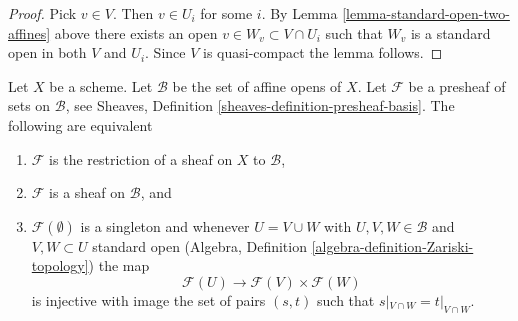 \begin{proof}
Pick $v \in V$. Then $v \in U_i$ for some $i$.
By Lemma \ref{lemma-standard-open-two-affines} above there exists an open
$v \in W_v \subset V \cap U_i$ such that
$W_v$ is a standard open in both $V$ and $U_i$.
Since $V$ is quasi-compact the lemma follows.
\end{proof}

\begin{lemma}
\label{lemma-sheaf-on-affines}
Let $X$ be a scheme. Let $\mathcal{B}$ be the set of affine opens of $X$.
Let $\mathcal{F}$ be a presheaf of sets on $\mathcal{B}$, see
Sheaves, Definition \ref{sheaves-definition-presheaf-basis}. The following
are equivalent
\begin{enumerate}
\item $\mathcal{F}$ is the restriction of a sheaf on $X$ to $\mathcal{B}$,
\item $\mathcal{F}$ is a sheaf on $\mathcal{B}$, and
\item $\mathcal{F}(\emptyset)$ is a singleton and
whenever $U = V \cup W$ with $U, V, W \in \mathcal{B}$ and
$V, W \subset U$ standard open
(Algebra, Definition \ref{algebra-definition-Zariski-topology})
the map
$$
\mathcal{F}(U) \longrightarrow \mathcal{F}(V) \times \mathcal{F}(W)
$$
is injective with image the set of pairs $(s, t)$
such that $s|_{V \cap W} = t|_{V \cap W}$.
\end{enumerate}
\end{lemma}

